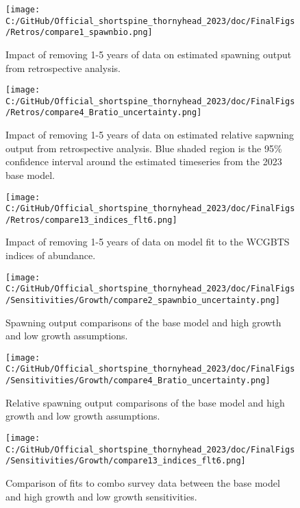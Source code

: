 \documentclass[11pt,
  letterpaper,
]{article}
\begin{document}
\clearpage

\begin{figure}
\centering
\texttt{[image: C:/GitHub/Official\_shortspine\_thornyhead\_2023/doc/FinalFigs/Retros/compare1\_spawnbio.png]}
\caption{Impact of removing 1-5 years of data on estimated spawning output from retrospective analysis.\label{fig:retros_spawnbio}}
\end{figure}

\begin{figure}
\centering
\texttt{[image: C:/GitHub/Official\_shortspine\_thornyhead\_2023/doc/FinalFigs/Retros/compare4\_Bratio\_uncertainty.png]}
\caption{Impact of removing 1-5 years of data on estimated relative sapwning output from retrospective analysis. Blue shaded region is the 95\% confidence interval around the estimated timeseries from the 2023 base model.\label{fig:retros_bratio_uncertainty}}
\end{figure}

\begin{figure}
\centering
\texttt{[image: C:/GitHub/Official\_shortspine\_thornyhead\_2023/doc/FinalFigs/Retros/compare13\_indices\_flt6.png]}
\caption{Impact of removing 1-5 years of data on model fit to the WCGBTS indices of abundance.\label{fig:retros_indices}}
\end{figure}

\begin{figure}
\centering
\texttt{[image: C:/GitHub/Official\_shortspine\_thornyhead\_2023/doc/FinalFigs/Sensitivities/Growth/compare2\_spawnbio\_uncertainty.png]}
\caption{Spawning output comparisons of the base model and high growth and low growth assumptions.\label{fig:growth_sensitiv_spawning}}
\end{figure}

\begin{figure}
\centering
\texttt{[image: C:/GitHub/Official\_shortspine\_thornyhead\_2023/doc/FinalFigs/Sensitivities/Growth/compare4\_Bratio\_uncertainty.png]}
\caption{Relative spawning output comparisons of the base model and high growth and low growth assumptions.\label{fig:growth_sensitiv_mngmt}}
\end{figure}

\begin{figure}
\centering
\texttt{[image: C:/GitHub/Official\_shortspine\_thornyhead\_2023/doc/FinalFigs/Sensitivities/Growth/compare13\_indices\_flt6.png]}
\caption{Comparison of fits to combo survey data between the base model and high growth and low growth sensitivities.\label{fig:growth_sensitiv_indx}}
\end{figure}
\end{document}
